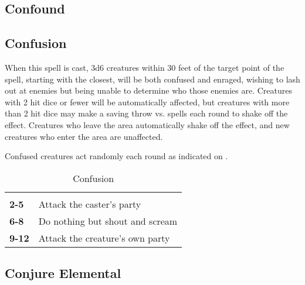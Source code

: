 \begin{multicols*}{2}
\subsection{Confound}\label{spell:Confound}



\subsection{Confusion}\label{spell:Confusion}

When this spell is cast, 3d6 creatures within 30 feet of the target point of the spell, starting with the closest, will be both confused and enraged, wishing to lash out at enemies but being unable to determine who those enemies are. Creatures with 2 hit dice or fewer will be automatically affected, but creatures with more than 2 hit dice may make a saving throw vs. spells each round to shake off the effect. Creatures who leave the area automatically shake off the effect, and new creatures who enter the area are unaffected.

Confused creatures act randomly each round as indicated on .

\begin {table}[H]
  \caption{Confusion}\label{tab:Confusion}
  \begin{tabularx}{\columnwidth}{>{\bfseries}YY}
	 & \\
	2-5 & Attack the caster’s party\\
	6-8 & Do nothing but shout and scream\\
	9-12 & Attack the creature’s own party
  \end {tabularx}
\end {table}

\subsection{Conjure Elemental}\label{spell:Conjure Elemental}
\end{multicols*}
